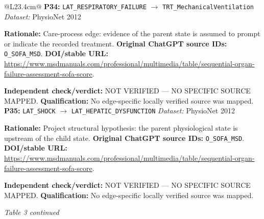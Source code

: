 \begin{tabular}{@{}L{23.4cm}@{}}
\addlinespace[2pt]
\midrule
\textbf{P34:} \nolinkurl{LAT_RESPIRATORY_FAILURE} $\rightarrow$ \nolinkurl{TRT_MechanicalVentilation} \hfill \textit{Dataset:} PhysioNet 2012\par\textbf{Rationale:} Care-process edge: evidence of the parent state is assumed to prompt or indicate the recorded treatment. \textbf{Original ChatGPT source IDs:} \nolinkurl{O_SOFA_MSD}. \textbf{DOI/stable URL:} \url{https://www.msdmanuals.com/professional/multimedia/table/sequential-organ-failure-assessment-sofa-score}.\par\textbf{Independent check/verdict:} NOT VERIFIED --- NO SPECIFIC SOURCE MAPPED. \textbf{Qualification:} No edge-specific locally verified source was mapped. \\
\addlinespace[2pt]
\midrule
\textbf{P35:} \nolinkurl{LAT_SHOCK} $\rightarrow$ \nolinkurl{LAT_HEPATIC_DYSFUNCTION} \hfill \textit{Dataset:} PhysioNet 2012\par\textbf{Rationale:} Project structural hypothesis: the parent physiological state is upstream of the child state. \textbf{Original ChatGPT source IDs:} \nolinkurl{O_SOFA_MSD}. \textbf{DOI/stable URL:} \url{https://www.msdmanuals.com/professional/multimedia/table/sequential-organ-failure-assessment-sofa-score}.\par\textbf{Independent check/verdict:} NOT VERIFIED --- NO SPECIFIC SOURCE MAPPED. \textbf{Qualification:} No edge-specific locally verified source was mapped. \\
\addlinespace[2pt]
\midrule
\bottomrule
\end{tabular}
\clearpage
\textit{Table 3 continued}\par
